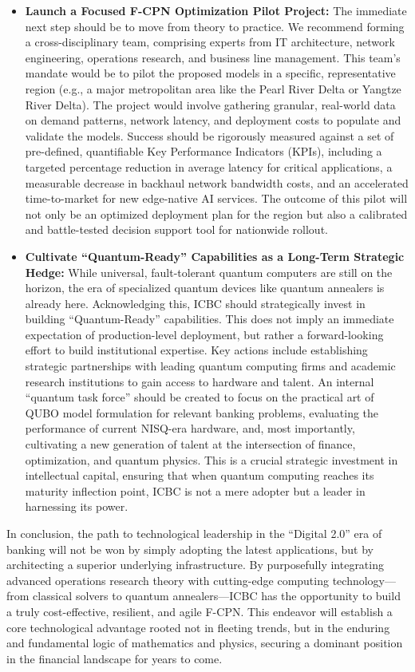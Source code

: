 \documentclass[11pt,a4paper]{article}
\begin{document}
\begin{itemize}
    \item \textbf{Launch a Focused F-CPN Optimization Pilot Project:} The immediate next step should be to move from theory to practice. We recommend forming a cross-disciplinary team, comprising experts from IT architecture, network engineering, operations research, and business line management. This team's mandate would be to pilot the proposed models in a specific, representative region (e.g., a major metropolitan area like the Pearl River Delta or Yangtze River Delta). The project would involve gathering granular, real-world data on demand patterns, network latency, and deployment costs to populate and validate the models. Success should be rigorously measured against a set of pre-defined, quantifiable Key Performance Indicators (KPIs), including a targeted percentage reduction in average latency for critical applications, a measurable decrease in backhaul network bandwidth costs, and an accelerated time-to-market for new edge-native AI services. The outcome of this pilot will not only be an optimized deployment plan for the region but also a calibrated and battle-tested decision support tool for nationwide rollout.
    \item \textbf{Cultivate ``Quantum-Ready'' Capabilities as a Long-Term Strategic Hedge:} While universal, fault-tolerant quantum computers are still on the horizon, the era of specialized quantum devices like quantum annealers is already here. Acknowledging this, ICBC should strategically invest in building ``Quantum-Ready'' capabilities. This does not imply an immediate expectation of production-level deployment, but rather a forward-looking effort to build institutional expertise. Key actions include establishing strategic partnerships with leading quantum computing firms and academic research institutions to gain access to hardware and talent. An internal ``quantum task force'' should be created to focus on the practical art of QUBO model formulation for relevant banking problems, evaluating the performance of current NISQ-era hardware, and, most importantly, cultivating a new generation of talent at the intersection of finance, optimization, and quantum physics. This is a crucial strategic investment in intellectual capital, ensuring that when quantum computing reaches its maturity inflection point, ICBC is not a mere adopter but a leader in harnessing its power.
\end{itemize}

In conclusion, the path to technological leadership in the ``Digital 2.0'' era of banking will not be won by simply adopting the latest applications, but by architecting a superior underlying infrastructure. By purposefully integrating advanced operations research theory with cutting-edge computing technology---from classical solvers to quantum annealers---ICBC has the opportunity to build a truly cost-effective, resilient, and agile F-CPN. This endeavor will establish a core technological advantage rooted not in fleeting trends, but in the enduring and fundamental logic of mathematics and physics, securing a dominant position in the financial landscape for years to come.
\end{document}
